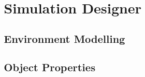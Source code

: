 \section{Simulation Designer} %
\label{sec:simulation_designer}
\subsection{Environment Modelling}\label{subsec:environment_modelling}
\subsection{Object Properties}\label{subsec:object_properties}
